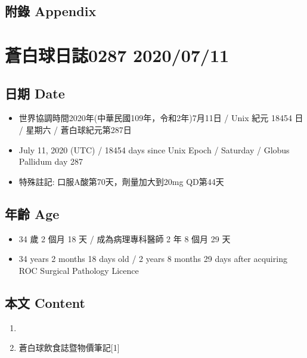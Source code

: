 \documentclass[a5paper, 11pt
]{book}
\providecommand{\tightlist}{%
  \setlength{\itemsep}{0pt}\setlength{\parskip}{0pt}}
\begin{document}
\hypertarget{ux9644ux9304-appendix-39}{%
\subsection{附錄 Appendix}\label{ux9644ux9304-appendix-39}}

\hypertarget{ux84bcux767dux7403ux65e5ux8a8c0287-20200711}{%
\section{蒼白球日誌0287
2020/07/11}\label{ux84bcux767dux7403ux65e5ux8a8c0287-20200711}}

\hypertarget{ux65e5ux671f-date-40}{%
\subsection{日期 Date}\label{ux65e5ux671f-date-40}}

\begin{itemize}
\tightlist
\item
  世界協調時間2020年(中華民國109年，令和2年)7月11日 / Unix 紀元 18454 日
  / 星期六 / 蒼白球紀元第287日
\item
  July 11, 2020 (UTC) / 18454 days since Unix Epoch / Saturday / Globus
  Pallidum day 287
\item
  特殊註記: 口服A酸第70天，劑量加大到20mg QD第44天
\end{itemize}

\hypertarget{ux5e74ux9f61-age-40}{%
\subsection{年齡 Age}\label{ux5e74ux9f61-age-40}}

\begin{itemize}
\tightlist
\item
  34 歲 2 個月 18 天 / 成為病理專科醫師 2 年 8 個月 29 天
\item
  34 years 2 months 18 days old / 2 years 8 months 29 days after
  acquiring ROC Surgical Pathology Licence
\end{itemize}

\hypertarget{ux672cux6587-content-40}{%
\subsection{本文 Content}\label{ux672cux6587-content-40}}

\begin{enumerate}
\def\labelenumi{\arabic{enumi}.}
\tightlist
\item
\item
  蒼白球飲食誌暨物價筆記{[}1{]}
\end{enumerate}
\end{document}
